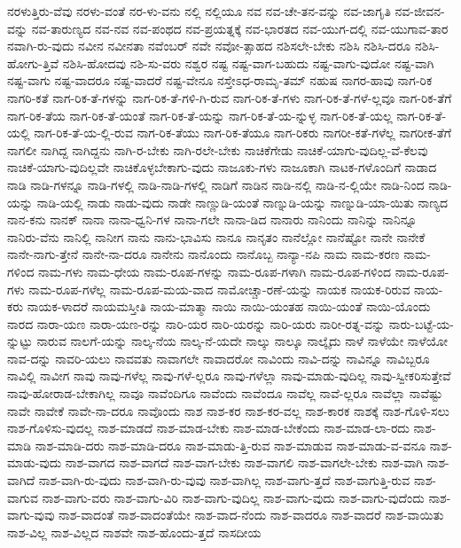 {ನರಳುತ್ತಿರು-ವೆವು
ನರಳು-ವಂತೆ
ನರ-ಳು-ವನು
ನಲ್ಲಿ
ನಲ್ಲಿಯೂ
ನವ
ನವ-ಚೇ-ತನ-ವನ್ನು
ನವ-ಜಾಗೃತಿ
ನವ-ಜೀವನ-ವನ್ನು
ನವ-ತಾರುಣ್ಯದ
ನವ-ನವ
ನವ-ಪಂಥದ
ನವ-ಪ್ರಯತ್ನಕ್ಕೆ
ನವ-ಭಾರತದ
ನವ-ಯುಗ-ದಲ್ಲಿ
ನವ-ಯುಗಾವ-ತಾರ
ನವಾಗಿ-ರು-ವುದು
ನವೀನ
ನವೀನತಾ
ನವೆಂಬರ್
ನವೇ
ನವೋ-ತ್ಸಾಹದ
ನಶಿಸಲೇ-ಬೇಕು
ನಶಿಸಿ
ನಶಿಸಿ-ದರೂ
ನಶಿಸಿ-ಹೋಗು-ತ್ತಿವೆ
ನಶಿಸಿ-ಹೋದವು
ನಶಿ-ಸು-ವರು
ನಶ್ವರ
ನಷ್ಟ
ನಷ್ಟ-ವಾಗ-ಬಹುದು
ನಷ್ಟ-ವಾಗು-ವುದೋ
ನಷ್ಟ-ವಾಗಿ
ನಷ್ಟ-ವಾಗು
ನಷ್ಟ-ವಾದರೂ
ನಷ್ಟ-ವಾದರೆ
ನಷ್ಟ-ವೇನೂ
ನಸ್ತೇಽಧ-ರಾಮೃ-ತಮ್
ನಹುಷ
ನಾಗರ-ಹಾವು
ನಾಗ-ರಿಕ
ನಾಗರಿ-ಕತೆ
ನಾಗ-ರಿಕ-ತೆ-ಗಳನ್ನು
ನಾಗ-ರಿಕ-ತೆ-ಗಳಿ-ಗಿ-ರುವ
ನಾಗ-ರಿಕ-ತೆ-ಗಳು
ನಾಗ-ರಿಕ-ತೆ-ಗಳೆ-ಲ್ಲವೂ
ನಾಗ-ರಿಕ-ತೆಗೆ
ನಾಗ-ರಿಕ-ತೆಯ
ನಾಗ-ರಿಕ-ತೆ-ಯಂತೆ
ನಾಗ-ರಿಕ-ತೆ-ಯನ್ನು
ನಾಗ-ರಿಕ-ತೆ-ಯ-ನ್ನುಳ್ಳ
ನಾಗ-ರಿಕ-ತೆ-ಯಲ್ಲ
ನಾಗ-ರಿಕ-ತೆ-ಯಲ್ಲಿ
ನಾಗ-ರಿಕ-ತೆ-ಯ-ಲ್ಲಿ-ರುವ
ನಾಗ-ರಿಕ-ತೆಯು
ನಾಗ-ರಿಕ-ತೆಯೂ
ನಾಗ-ರಿಕರು
ನಾಗರೀ-ಕತೆ-ಗಳೆಲ್ಲ
ನಾಗರೀಕ-ತೆಗೆ
ನಾಗಲೀ
ನಾಗಿದ್ದ
ನಾಗಿದ್ದನು
ನಾಗಿ-ರ-ಬೇಕು
ನಾಗಿ-ರಲೇ-ಬೇಕು
ನಾಚಿಕೆಗೇಡು
ನಾಚಿಕೆ-ಯಾಗು-ವುದಿಲ್ಲ-ವೆ-ಕೆಲವು
ನಾಚಿಕೆ-ಯಾಗು-ವುದಿಲ್ಲವೇ
ನಾಚಿಕೊಳ್ಳಬೇಕಾಗು-ವುದು
ನಾಜೂಕು-ಗಳು
ನಾಜೂಕಾಗಿ
ನಾಟಕ-ಗಳೊಂದಿಗೆ
ನಾಡಾದ
ನಾಡಿ
ನಾಡಿ-ಗಳನ್ನೂ
ನಾಡಿ-ಗಳಲ್ಲಿ
ನಾಡಿ-ನಾಡಿ-ಗಳಲ್ಲಿ
ನಾಡಿಗೆ
ನಾಡಿನ
ನಾಡಿ-ನಲ್ಲಿ
ನಾಡಿ-ನ-ಲ್ಲಿಯೇ
ನಾಡಿ-ನಿಂದ
ನಾಡಿ-ಯನ್ನು
ನಾಡಿ-ಯಲ್ಲಿ
ನಾಡು
ನಾಡು-ವುದು
ನಾಡೇ
ನಾಣ್ಣುಡಿ-ಯಂತೆ
ನಾಣ್ನುಡಿ-ಯನ್ನು
ನಾಣ್ನುಡಿ-ಯಾ-ಯಿತು
ನಾಣ್ಯದ
ನಾನ-ಕನು
ನಾನಕ್
ನಾನಾ
ನಾನಾ-ಧ್ವನಿ-ಗಳ
ನಾನಾ-ಗಲೇ
ನಾನಾ-ಡಿದ
ನಾನಾರು
ನಾನಿಂದು
ನಾನಿನ್ನು
ನಾನಿನ್ನೂ
ನಾನಿರು-ವೆನು
ನಾನಿಲ್ಲಿ
ನಾನೀಗ
ನಾನು
ನಾನು-ಭಾವಿಸು
ನಾನೂ
ನಾನೃತಂ
ನಾನೆಲ್ಲೋ
ನಾನೆಷ್ಟೋ
ನಾನೇ
ನಾನೇಕೆ
ನಾನೇ-ನಾಗು-ತ್ತೇನೆ
ನಾನೇ-ನಾ-ದರೂ
ನಾನೇನು
ನಾನೊಂದು
ನಾನೊಬ್ಬ
ನಾನ್ಯಾ-ನಪಿ
ನಾಮ
ನಾಮ-ಕರಣ
ನಾಮ-ಗಳಿಂದ
ನಾಮ-ಗಳು
ನಾಮ-ಧೇಯ
ನಾಮ-ರೂಪ-ಗಳನ್ನು
ನಾಮ-ರೂಪ-ಗಳಾಗಿ
ನಾಮ-ರೂಪ-ಗಳಿಂದ
ನಾಮ-ರೂಪ-ಗಳು
ನಾಮ-ರೂಪ-ಗಳೆಲ್ಲ
ನಾಮ-ರೂಪ-ಮಯ-ವಾದ
ನಾಮೋಚ್ಚಾ-ರಣೆ-ಯನ್ನು
ನಾಯಕ
ನಾಯಕ-ರಿರುವ
ನಾಯ-ಕರು
ನಾಯಕ-ಳಾದರೆ
ನಾಯಮಸ್ತೀತಿ
ನಾಯ-ಮಾತ್ಮಾ
ನಾಯಿ
ನಾಯಿ-ಯಂತಹ
ನಾಯಿ-ಯಂತೆ
ನಾಯಿ-ಯೊಂದು
ನಾರದ
ನಾರಾ-ಯಣ
ನಾರಾ-ಯಣ-ರನ್ನು
ನಾರಿ-ಯರ
ನಾರಿ-ಯರನ್ನು
ನಾರಿ-ಯರು
ನಾರೀ-ರತ್ನ-ವನ್ನು
ನಾರು-ಬಟ್ಟೆ-ಯ-ನ್ನುಟ್ಟು
ನಾರುವ
ನಾಲಗೆ-ಯನ್ನು
ನಾಲ್ಕ-ನೆಯ
ನಾಲ್ಕ-ನೆ-ಯದೇ
ನಾಲ್ಕು
ನಾಲ್ಕೂ
ನಾಲ್ಕೈದು
ನಾಳೆ
ನಾಳೆಯೇ
ನಾಳೆಯೋ
ನಾವ-ದನ್ನು
ನಾವರಿ-ಯಲು
ನಾವವತು
ನಾವಾಗಲೇ
ನಾವಾದರೋ
ನಾವಿಂದು
ನಾವಿ-ದನ್ನು
ನಾವಿನ್ನೂ
ನಾವಿಬ್ಬರೂ
ನಾವಿಲ್ಲಿ
ನಾವೀಗ
ನಾವು
ನಾವು-ಗಳೆಲ್ಲ
ನಾವು-ಗಳೆ-ಲ್ಲರೂ
ನಾವು-ಗಳೆಲ್ಲಾ
ನಾವು-ಮಾಡು-ವುದಿಲ್ಲ
ನಾವು-ಸ್ವೀಕರಿಸುತ್ತೇವೆ
ನಾವು-ಹೋರಾಡ-ಬೇಕಾಗಿಲ್ಲ
ನಾವೂ
ನಾವೆಂದಿಗೂ
ನಾವೆಂದು
ನಾವೆಂದೂ
ನಾವೆಲ್ಲ
ನಾವೆ-ಲ್ಲರೂ
ನಾವೆಲ್ಲಾ
ನಾವೆಷ್ಟು
ನಾವೇ
ನಾವೇಕೆ
ನಾವೇ-ನಾ-ದರೂ
ನಾವೊಂದು
ನಾಶ
ನಾಶ-ಕರ
ನಾಶ-ಕರ-ವಲ್ಲ
ನಾಶ-ಕಾರಕ
ನಾಶಕ್ಕೆ
ನಾಶ-ಗೊಳಿ-ಸಲು
ನಾಶ-ಗೊಳಿಸು-ವುದಲ್ಲ
ನಾಶ-ಮಾಡದೆ
ನಾಶ-ಮಾಡ-ಬೇಕು
ನಾಶ-ಮಾಡ-ಬೇಕೆಂದು
ನಾಶ-ಮಾಡ-ಲಾ-ರದು
ನಾಶ-ಮಾಡಿ
ನಾಶ-ಮಾಡಿ-ದರು
ನಾಶ-ಮಾಡಿ-ದರೂ
ನಾಶ-ಮಾಡು-ತ್ತಿ-ರುವ
ನಾಶ-ಮಾಡುವ
ನಾಶ-ಮಾಡು-ವ-ವನೂ
ನಾಶ-ಮಾಡು-ವುದು
ನಾಶ-ವಾಗದ
ನಾಶ-ವಾಗದೆ
ನಾಶ-ವಾಗ-ಬೇಕು
ನಾಶ-ವಾಗಲಿ
ನಾಶ-ವಾಗಲೇ-ಬೇಕು
ನಾಶ-ವಾಗಿ
ನಾಶ-ವಾಗಿದೆ
ನಾಶ-ವಾಗಿ-ರು-ವುದು
ನಾಶ-ವಾಗಿ-ರು-ವುವು
ನಾಶ-ವಾಗಿಲ್ಲ
ನಾಶ-ವಾಗು-ತ್ತದೆ
ನಾಶ-ವಾಗುತ್ತಿ-ರುವ
ನಾಶ-ವಾಗುವ
ನಾಶ-ವಾಗು-ವರು
ನಾಶ-ವಾಗು-ವಿರಿ
ನಾಶ-ವಾಗು-ವುದಿಲ್ಲ
ನಾಶ-ವಾಗು-ವುದು
ನಾಶ-ವಾಗು-ವುದೆಂದು
ನಾಶ-ವಾಗು-ವುವು
ನಾಶ-ವಾದಂತೆ
ನಾಶ-ವಾದಂತೆಯೇ
ನಾಶ-ವಾದ-ನೆಂದು
ನಾಶ-ವಾದರೂ
ನಾಶ-ವಾದರೆ
ನಾಶ-ವಾಯಿತು
ನಾಶ-ವಿಲ್ಲ
ನಾಶ-ವಿಲ್ಲದ
ನಾಶವೇ
ನಾಶ-ಹೊಂದು-ತ್ತದೆ
ನಾಸದೀಯ
}
